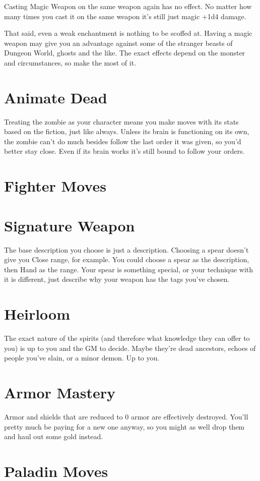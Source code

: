  Casting Magic Weapon on the same weapon again has no effect. No matter how many times you cast it on the same weapon it's still just magic +1d4 damage.


 That said, even a weak enchantment is nothing to be scoffed at. Having a magic weapon may give you an advantage against some of the stranger beasts of Dungeon World, ghosts and the like. The exact effects depend on the monster and circumstances, so make the most of it.
\section{Animate Dead}


 Treating the zombie as your character means you make moves with its stats based on the fiction, just like always. Unless its brain is functioning on its own, the zombie can't do much besides follow the last order it was given, so you'd better stay close. Even if its brain works it's still bound to follow your orders.
\section{Fighter Moves}
\section{Signature Weapon}


 The base description you choose is just a description. Choosing a spear doesn't give you Close range, for example. You could choose a spear as the description, then Hand as the range. Your spear is something special, or your technique with it is different, just describe why your weapon has the tags you've chosen.
\section{Heirloom}


 The exact nature of the spirits (and therefore what knowledge they can offer to you) is up to you and the GM to decide. Maybe they're dead ancestors, echoes of people you've slain, or a minor demon. Up to you.
\section{Armor Mastery}


 Armor and shields that are reduced to 0 armor are effectively destroyed. You'll pretty much be paying for a new one anyway, so you might as well drop them and haul out some gold instead.
\section{Paladin Moves}
